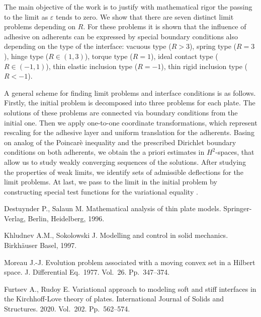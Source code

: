 \documentclass[12pt]{llncs}
\begin{document}
 The main objective of the work is to justify with mathematical rigor the passing to the limit as $\varepsilon$  tends to zero. We show that there are seven distinct limit problems depending on $R$. For these  problems it is shown that the influence of adhesive on adherents can be expressed by special boundary conditions also depending on the type of the interface:  vacuous type ($R>3$), spring type ($R=3$), hinge   type ($R\in (1,3)$), torque     type  ($R=1$), ideal contact   type  ($R\in(-1,1)$), thin elastic inclusion type  ($R=-1$), thin rigid  inclusion    type  ($R<-1$).


A general scheme for finding limit problems and interface conditions is as follows. Firstly, the initial problem is decomposed into three problems for each plate. The solutions of these problems are connected via boundary conditions from the initial one. Then we apply one-to-one coordinate transformations,  which represent rescaling for the adhesive layer and uniform translation  for the adherents. Basing on   analog of the Poincar\`{e}  inequality and the prescribed  Dirichlet
boundary conditions on both adherents, we obtain the a priori estimates in $H^2$-spaces, that allow us to study weakly converging sequences of the solutions. After studying  the properties of weak limits, we identify sets of admissible deflections for the limit problems. At last,  we pass to the limit in the initial problem by constructing special  test functions for the variational equality \cite{Rudoy}.


\begin{thebibliography}{9} %
 Destuynder P.,   Salaun M. Mathematical analysis of thin plate models. Springer-Verlag, Berlin, Heidelberg, 1996.

 { Khludnev A.M., Sokolowski J.}
Modelling and control in solid mechanics. Birkh\"{a}user Basel, 1997.



 Moreau J.-J. Evolution problem associated with a moving convex set in a Hilbert space. J. Differential Eq.~1977. Vol.~26. Pp.~347--374.

  Furtsev A.,   Rudoy E. Variational approach to modeling soft and stiff interfaces in the Kirchhoff-Love theory of plates. International Journal of Solids and Structures. 2020. Vol.~202. Pp.~562--574.



\end{thebibliography}



\end{document}
